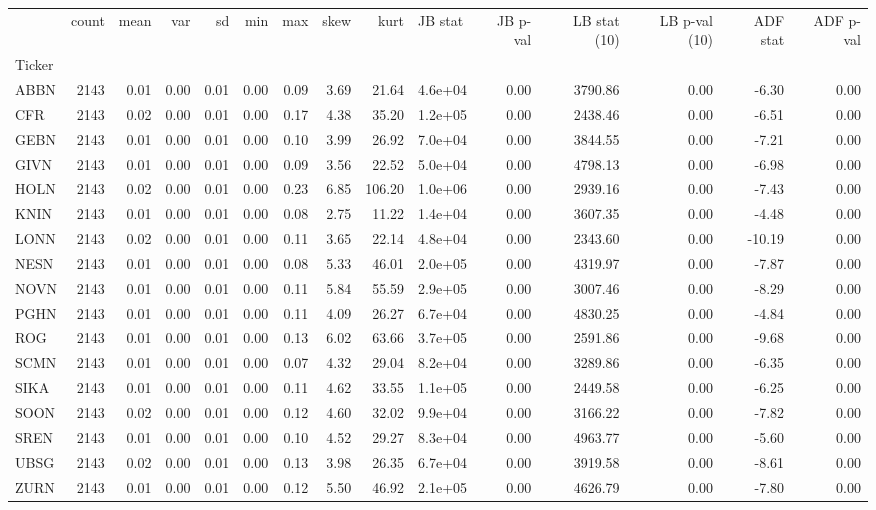 \begin{tabular}{lrrrrrrrrlrrrrr}
\toprule
 & count & mean & var & sd & min & max & skew & kurt & JB stat & JB p-val & LB stat (10) & LB p-val (10) & ADF stat & ADF p-val \\
Ticker &  &  &  &  &  &  &  &  &  &  &  &  &  &  \\
\midrule
ABBN & 2143 & 0.01 & 0.00 & 0.01 & 0.00 & 0.09 & 3.69 & 21.64 & 4.6e+04 & 0.00 & 3790.86 & 0.00 & -6.30 & 0.00 \\
CFR & 2143 & 0.02 & 0.00 & 0.01 & 0.00 & 0.17 & 4.38 & 35.20 & 1.2e+05 & 0.00 & 2438.46 & 0.00 & -6.51 & 0.00 \\
GEBN & 2143 & 0.01 & 0.00 & 0.01 & 0.00 & 0.10 & 3.99 & 26.92 & 7.0e+04 & 0.00 & 3844.55 & 0.00 & -7.21 & 0.00 \\
GIVN & 2143 & 0.01 & 0.00 & 0.01 & 0.00 & 0.09 & 3.56 & 22.52 & 5.0e+04 & 0.00 & 4798.13 & 0.00 & -6.98 & 0.00 \\
HOLN & 2143 & 0.02 & 0.00 & 0.01 & 0.00 & 0.23 & 6.85 & 106.20 & 1.0e+06 & 0.00 & 2939.16 & 0.00 & -7.43 & 0.00 \\
KNIN & 2143 & 0.01 & 0.00 & 0.01 & 0.00 & 0.08 & 2.75 & 11.22 & 1.4e+04 & 0.00 & 3607.35 & 0.00 & -4.48 & 0.00 \\
LONN & 2143 & 0.02 & 0.00 & 0.01 & 0.00 & 0.11 & 3.65 & 22.14 & 4.8e+04 & 0.00 & 2343.60 & 0.00 & -10.19 & 0.00 \\
NESN & 2143 & 0.01 & 0.00 & 0.01 & 0.00 & 0.08 & 5.33 & 46.01 & 2.0e+05 & 0.00 & 4319.97 & 0.00 & -7.87 & 0.00 \\
NOVN & 2143 & 0.01 & 0.00 & 0.01 & 0.00 & 0.11 & 5.84 & 55.59 & 2.9e+05 & 0.00 & 3007.46 & 0.00 & -8.29 & 0.00 \\
PGHN & 2143 & 0.01 & 0.00 & 0.01 & 0.00 & 0.11 & 4.09 & 26.27 & 6.7e+04 & 0.00 & 4830.25 & 0.00 & -4.84 & 0.00 \\
ROG & 2143 & 0.01 & 0.00 & 0.01 & 0.00 & 0.13 & 6.02 & 63.66 & 3.7e+05 & 0.00 & 2591.86 & 0.00 & -9.68 & 0.00 \\
SCMN & 2143 & 0.01 & 0.00 & 0.01 & 0.00 & 0.07 & 4.32 & 29.04 & 8.2e+04 & 0.00 & 3289.86 & 0.00 & -6.35 & 0.00 \\
SIKA & 2143 & 0.01 & 0.00 & 0.01 & 0.00 & 0.11 & 4.62 & 33.55 & 1.1e+05 & 0.00 & 2449.58 & 0.00 & -6.25 & 0.00 \\
SOON & 2143 & 0.02 & 0.00 & 0.01 & 0.00 & 0.12 & 4.60 & 32.02 & 9.9e+04 & 0.00 & 3166.22 & 0.00 & -7.82 & 0.00 \\
SREN & 2143 & 0.01 & 0.00 & 0.01 & 0.00 & 0.10 & 4.52 & 29.27 & 8.3e+04 & 0.00 & 4963.77 & 0.00 & -5.60 & 0.00 \\
UBSG & 2143 & 0.02 & 0.00 & 0.01 & 0.00 & 0.13 & 3.98 & 26.35 & 6.7e+04 & 0.00 & 3919.58 & 0.00 & -8.61 & 0.00 \\
ZURN & 2143 & 0.01 & 0.00 & 0.01 & 0.00 & 0.12 & 5.50 & 46.92 & 2.1e+05 & 0.00 & 4626.79 & 0.00 & -7.80 & 0.00 \\
\bottomrule
\end{tabular}
